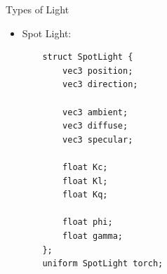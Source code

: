 \documentclass{beamer}
\begin{document}
\begin{frame}[fragile]{Types of Light}
    \begin{itemize}
        \item Spot Light:
\footnotesize{
\begin{verbatim}
    struct SpotLight {
        vec3 position;
        vec3 direction;
        
        vec3 ambient;
        vec3 diffuse;
        vec3 specular;

        float Kc;
        float Kl;
        float Kq;

        float phi;
        float gamma;
    };
    uniform SpotLight torch;
\end{verbatim}
}
    \end{itemize}
\end{frame}
\end{document}
